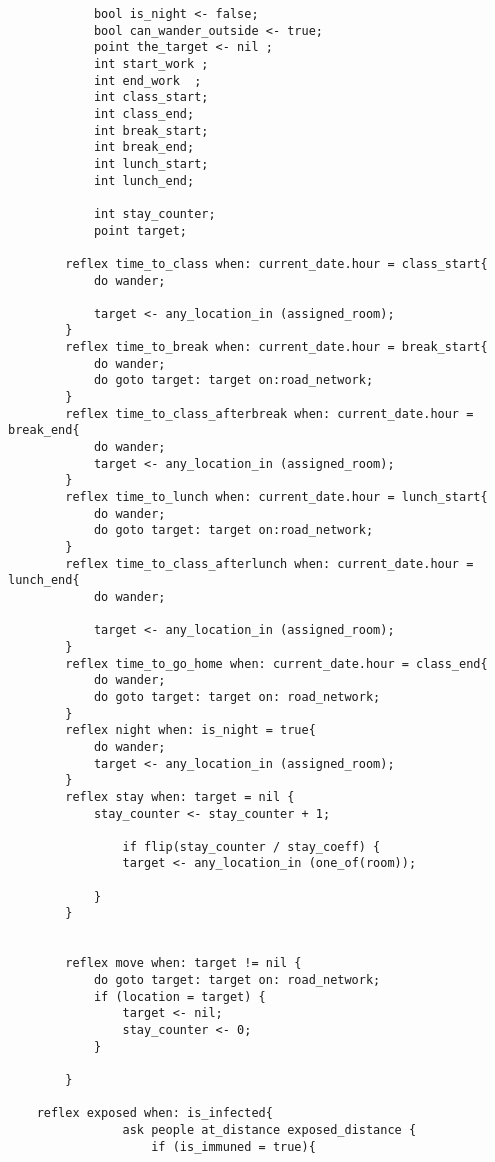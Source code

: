 \begin{lstlisting}
            bool is_night <- false;
            bool can_wander_outside <- true;
            point the_target <- nil ;
            int start_work ;
            int end_work  ;
            int class_start;
            int class_end;
            int break_start;
            int break_end;
            int lunch_start;
            int lunch_end;
            
            int stay_counter;
            point target;
            
        reflex time_to_class when: current_date.hour = class_start{
            do wander;
            
            target <- any_location_in (assigned_room);
        }
        reflex time_to_break when: current_date.hour = break_start{
            do wander;
            do goto target: target on:road_network;	
        }
        reflex time_to_class_afterbreak when: current_date.hour = break_end{
            do wander;
            target <- any_location_in (assigned_room);	
        }
        reflex time_to_lunch when: current_date.hour = lunch_start{
            do wander;
            do goto target: target on:road_network;	
        }
        reflex time_to_class_afterlunch when: current_date.hour = lunch_end{
            do wander;
            
            target <- any_location_in (assigned_room);
        }	
        reflex time_to_go_home when: current_date.hour = class_end{
            do wander;
            do goto target: target on: road_network;
        } 
        reflex night when: is_night = true{
            do wander;
            target <- any_location_in (assigned_room);
        }
        reflex stay when: target = nil {
            stay_counter <- stay_counter + 1;
            
                if flip(stay_counter / stay_coeff) {
                target <- any_location_in (one_of(room));
            
            }		
        }
    
        
        reflex move when: target != nil {
            do goto target: target on: road_network;
            if (location = target) {
                target <- nil;
                stay_counter <- 0;
            }
    
        }
         
    reflex exposed when: is_infected{
                ask people at_distance exposed_distance {
                    if (is_immuned = true){
                        

\end{lstlisting}

